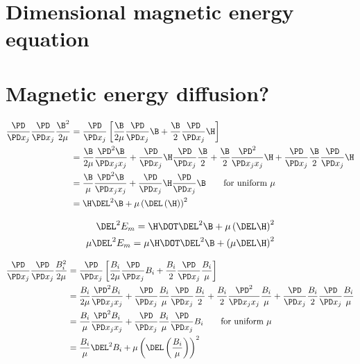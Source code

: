 \documentclass[11pt]{article}
\begin{document}
\doublespacing
\MOONSTITLE
\maketitle

\section{Dimensional magnetic energy equation}

\section{Magnetic energy diffusion?}
\begin{align}
	\frac{\PD}{\PD x_j} \frac{\PD}{\PD x_j} \frac{\B^2}{2 \mu}
	& =
	\frac{\PD}{\PD x_j}
	\left[
	\frac{\B}{2\mu} \frac{\PD}{\PD x_j} \B +
	\frac{\B}{2} \frac{\PD}{\PD x_j} \H
	\right] \\
	& =
	\frac{\B}{2\mu} \frac{\PD^2 \B}{\PD x_jx_j} +
	\frac{\PD}{\PD x_j} \H \frac{\PD}{\PD x_j} \frac{\B}{2} +
	\frac{\B}{2} \frac{\PD^2 }{\PD x_jx_j} \H +
	\frac{\PD}{\PD x_j} \frac{\B}{2} \frac{\PD}{\PD x_j} \H \\
	& =
	\frac{\B}{\mu} \frac{\PD^2 \B}{\PD x_jx_j} +
	\frac{\PD}{\PD x_j} \H \frac{\PD}{\PD x_j} \B \qquad \text{for uniform $\mu$} \\
	& = \H \DEL^2 \B + \mu \left(\DEL \left( \H \right) \right)^2
\end{align}

\begin{equation}\begin{aligned}
	\DEL^2 E_m = \H \DOT \DEL^2 \B + \mu \left( \DEL \H \right)^2 \\
	\mu \DEL^2 E_m = \mu \H \DOT \DEL^2 \B + \left( \mu \DEL \H \right)^2 \\
\end{aligned}\end{equation}

\begin{align}
	\frac{\PD}{\PD x_j} \frac{\PD}{\PD x_j} \frac{B_i^2}{2 \mu}
	& =
	\frac{\PD}{\PD x_j}
	\left[
	\frac{B_i}{2\mu} \frac{\PD}{\PD x_j} B_i +
	\frac{B_i}{2} \frac{\PD}{\PD x_j} \frac{B_i}{\mu}
	\right] \\
	& =
	\frac{B_i}{2\mu} \frac{\PD^2 B_i}{\PD x_jx_j} +
	\frac{\PD}{\PD x_j} \frac{B_i}{\mu} \frac{\PD}{\PD x_j} \frac{B_i}{2} +
	\frac{B_i}{2} \frac{\PD^2 }{\PD x_jx_j} \frac{B_i}{\mu} +
	\frac{\PD}{\PD x_j} \frac{B_i}{2} \frac{\PD}{\PD x_j} \frac{B_i}{\mu} \\
	& =
	\frac{B_i}{\mu} \frac{\PD^2 B_i}{\PD x_jx_j} +
	\frac{\PD}{\PD x_j} \frac{B_i}{\mu} \frac{\PD}{\PD x_j} B_i \qquad \text{for uniform $\mu$} \\
	& = \frac{B_i}{\mu} \DEL^2 B_i + \mu \left(\DEL \left( \frac{B_i}{\mu} \right) \right)^2
\end{align}
\end{document}

